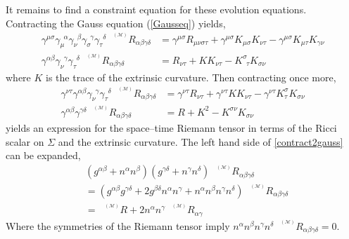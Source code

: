 \documentclass[11pt]{article}
\newcommand{\blank}{\enspace}
\newcommand{\sttensor}{\text{ }{\scriptscriptstyle ^{^{(\mathcal{M})}}}}
\numberwithin{equation}{section}
\begin{document}
It remains to find a constraint equation for these evolution equations. Contracting the Gauss equation (\ref{Gausseq}) yields,
\begin{align}
    \gamma^{\mu\sigma} \gamma_{\mu}^{\blank\alpha} \gamma_{\nu}^{\blank\beta} \gamma_{\sigma}^{\blank\gamma} \gamma_{\tau}^{\blank\delta} \sttensor R_{\alpha\beta\gamma\delta} &= \gamma^{\mu\sigma} R_{\mu\nu\sigma\tau} + \gamma^{\mu\sigma} K_{\mu\sigma} K_{\nu\tau} - \gamma^{\mu\sigma} K_{\mu\tau} K_{\gamma\nu} \\
    \gamma^{\alpha\beta} \gamma_{\nu}^{\blank\gamma} \gamma_{\tau}^{\blank\delta} \sttensor R_{\alpha\beta\gamma\delta} &= R_{\nu\tau} + K K_{\nu\tau} - K^{\sigma}_{\blank\tau} K_{\sigma\nu} \label{contractgauss}
\end{align}
where $K$ is the trace of the extrinsic curvature. Then contracting once more,
\begin{align}
    \gamma^{\nu\tau} \gamma^{\alpha\beta} \gamma_{\nu}^{\blank\gamma} \gamma_{\tau}^{\blank\delta} \sttensor R_{\alpha\beta\gamma\delta} &= \gamma^{\nu\tau} R_{\nu\tau} + \gamma^{\nu\tau} K K_{\nu\tau} - \gamma^{\nu\tau} K^{\sigma}_{\tau}K_{\sigma\nu} \\
    \gamma^{\alpha\beta} \gamma^{\gamma\delta} \sttensor R_{\alpha\beta\gamma\delta} &= R + K^2 - K^{\sigma\nu}K_{\sigma\nu} \label{contract2gauss}
\end{align}
yields an expression for the space--time Riemann tensor in terms of the Ricci scalar on $\Sigma$ and the extrinsic curvature. The left hand side of \ref{contract2gauss} can be expanded,
\begin{align}
    &(g^{\alpha\beta} + n^{\alpha}n^{\beta})(g^{\gamma\delta} + n^{\gamma}n^{\delta})\sttensor R_{\alpha\beta\gamma\delta}  \\ &= (g^{\alpha\beta}g^{\gamma\delta} + 2g^{\beta\delta}n^{\alpha}n^{\gamma} + n^{\alpha}n^{\beta}n^{\gamma}n^{\delta}) \sttensor R_{\alpha\beta\gamma\delta} \\ &= \sttensor R + 2n^{\alpha}n^{\gamma} \sttensor R_{\alpha\gamma} \label{28}
\end{align}
Where the symmetries of the Riemann tensor imply $n^{\alpha}n^{\beta}n^{\gamma}n^{\delta} \sttensor R_{\alpha\beta\gamma\delta} = 0$. 
\end{document}

